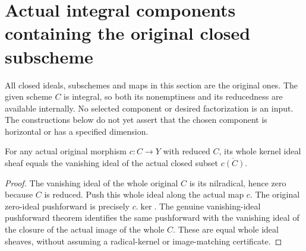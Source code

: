 \section{Actual integral components containing the original closed subscheme}
All closed ideals, subschemes and maps in this section are the original
ones. The given scheme $C$ is integral, so both its nonemptiness and its
reducedness are available internally. No selected component or desired
factorization is an input. The constructions below do not yet assert
that the chosen component is horizontal or has a specified dimension.

\begin{lemma}
\label{lem:pl-gauss-reduced-original-image-kernel}
\leanok
For any actual original morphism $c:C\to Y$ with reduced $C$, its
whole kernel ideal sheaf equals the vanishing ideal of the actual
closed subset $\overline{c(C)}$.
\end{lemma}
\begin{proof}
The vanishing ideal of the whole original $C$ is its nilradical, hence
zero because $C$ is reduced. Push this whole ideal along the actual
map $c$. The original zero-ideal pushforward is precisely $c.\ker$.
The genuine vanishing-ideal pushforward theorem identifies the same
pushforward with the vanishing ideal of the closure of the actual
image of the whole $C$. These are equal whole ideal sheaves, without
assuming a radical-kernel or image-matching certificate.
\end{proof}

